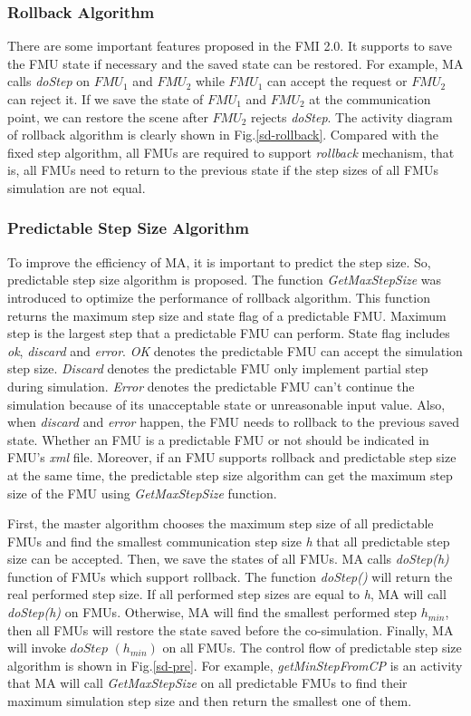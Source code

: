 \subsubsection{Rollback Algorithm}
There are some important features proposed in the FMI 2.0. It supports to save the FMU state if necessary and the saved state can be restored. For example, MA calls \emph{doStep} on $FMU_{1}$ and $FMU_{2}$ while $FMU_{1}$ can accept the request or $FMU_{2}$ can reject it. If we save the state of $FMU_{1}$ and $FMU_{2}$ at the communication point, we can restore the scene after $FMU_{2}$ rejects \emph{doStep}. The activity diagram of rollback algorithm is clearly shown in Fig.\ref{sd-rollback}. Compared with the fixed step algorithm, all FMUs are required to support \emph{rollback} mechanism, that is, all FMUs need to return to the previous state if the  step sizes of all FMUs simulation are not equal.
\subsubsection{Predictable Step Size Algorithm}
To improve the efficiency of MA, it is important to predict the step size. So, predictable step size algorithm is proposed. The function \emph{GetMaxStepSize} was introduced to optimize the performance of rollback algorithm. This function returns the maximum step size and state flag of a predictable FMU. Maximum step is the largest step that a predictable FMU can perform. State flag includes \emph{ok}, \emph{discard} and \emph{error}. \emph{OK} denotes the predictable FMU can accept the simulation step size. \emph{Discard} denotes the predictable FMU only implement partial step during simulation. \emph{Error} denotes the predictable FMU can't continue the simulation because of its unacceptable state or unreasonable input value. Also, when \emph{discard} and \emph{error} happen, the FMU needs to rollback to the previous saved state. Whether an FMU is a predictable FMU or not should be indicated in FMU's \emph{xml} file. Moreover, if an FMU supports rollback and predictable step size at the same time, the predictable step size algorithm can get the maximum step size of the FMU using \emph{GetMaxStepSize} function.

First, the master algorithm chooses the maximum step size of all predictable FMUs and find the smallest communication step size \emph{h} that all predictable step size can be accepted. Then, we save the states of all FMUs. MA calls \emph{doStep(h)} function of FMUs which support rollback. The function \emph{doStep()} will return the real performed step size. If all performed step sizes are equal to \emph{h}, MA will call \emph{doStep(h)} on FMUs. Otherwise, MA will find the smallest performed step $h_{min}$, then all FMUs will restore the state saved before the co-simulation. Finally, MA will invoke $doStep$ $(h_{min})$ on all FMUs. The control flow of predictable step size algorithm is shown in Fig.\ref{sd-pre}. For example, \emph{getMinStepFromCP} is an activity that MA will call \emph{GetMaxStepSize} on all predictable FMUs to find their maximum simulation step size and then return the smallest one of them. 

